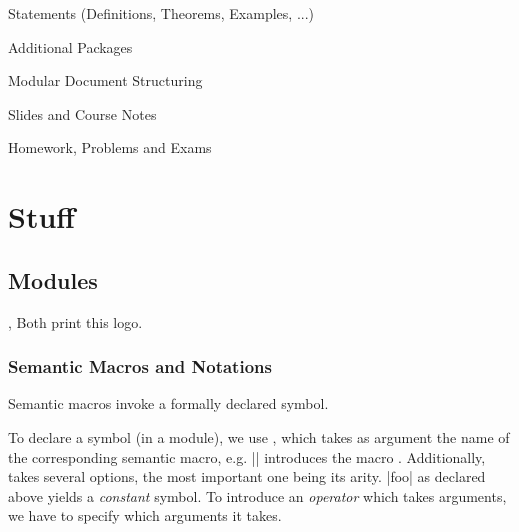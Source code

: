 \begin{omgroup}{\sTeX Statements (Definitions, Theorems, Examples, ...)}
  
  
\end{omgroup}

\begin{omgroup}{Additional Packages}
  
  \begin{omgroup}{Modular Document Structuring}
    
  \end{omgroup}
  \begin{omgroup}{Slides and Course Notes}
    
  \end{omgroup}
  \begin{omgroup}{Homework, Problems and Exams}
    
    
  \end{omgroup}

\end{omgroup}

\chapter{Stuff}

\section{Modules}


\begin{function}{\sTeX , \stex}
  Both print this \stex logo.
\end{function}

 \subsection{Semantic Macros and Notations}

 Semantic macros invoke a formally declared symbol.

 To declare a symbol (in a module), we use ,
 which takes as argument the name of the corresponding
 semantic macro, e.g. || introduces the macro
 . Additionally,  takes several options,
 the most important one being its arity. |foo| as declared above
 yields a \emph{constant} symbol. To introduce an \emph{operator}
 which takes arguments, we have to specify which arguments it takes.

